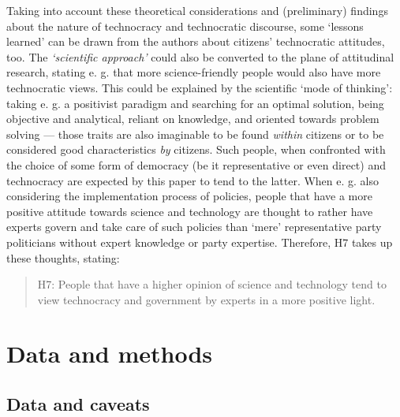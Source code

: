 \documentclass[
  12pt,
  english,
]{article}
\begin{document}
Taking into account these theoretical considerations and (preliminary)
findings about the nature of technocracy and technocratic discourse,
some `lessons learned' can be drawn from the authors about citizens'
technocratic attitudes, too. The \emph{`scientific approach'} could also
be converted to the plane of attitudinal research, stating e. g. that
more science-friendly people would also have more technocratic views.
This could be explained by the scientific `mode of thinking': taking e.
g. a positivist paradigm and searching for an optimal solution, being
objective and analytical, reliant on knowledge, and oriented towards
problem solving --- those traits are also imaginable to be found
\emph{within} citizens or to be considered good characteristics
\emph{by} citizens. Such people, when confronted with the choice of some
form of democracy (be it representative or even direct) and technocracy
are expected by this paper to tend to the latter. When e. g. also
considering the implementation process of policies, people that have a
more positive attitude towards science and technology are thought to
rather have experts govern and take care of such policies than `mere'
representative party politicians without expert knowledge or party
expertise. Therefore, H7 takes up these thoughts, stating:

\begin{quote}
H7: People that have a higher opinion of science and technology tend to
view technocracy and government by experts in a more positive light.
\end{quote}

\newpage{}

\hypertarget{data-and-methods}{%
\section{Data and methods}\label{data-and-methods}}

\hypertarget{data-and-caveats}{%
\subsection{Data and caveats}\label{data-and-caveats}}
\end{document}
